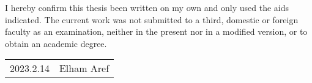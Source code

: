 \newcommand{\theauthor}{Elham Aref}
\pagestyle{empty}

\setlength{\parindent}{0in}
%
%

I hereby confirm this thesis been written on my own and only used the aids indicated.
The current work was not submitted to a third, domestic or foreign faculty as an examination, neither in the present nor in a modified version, or to obtain an academic degree.

\vspace{1cm}

\begin{flushright}
	\begin{tabular}{p{2cm}p{6cm}}
		\hline
		2023.2.14  & \theauthor
		\smallskip
	\end{tabular}
\end{flushright}
